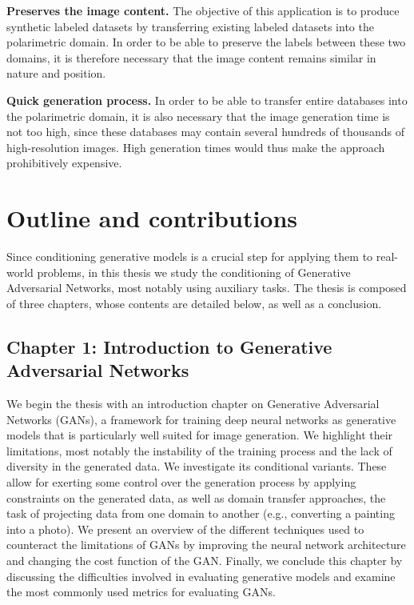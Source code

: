 \textbf{Preserves the image content.} The objective of this application is to produce synthetic labeled datasets by transferring existing labeled datasets into the polarimetric domain. In order to be able to preserve the labels between these two domains, it is therefore necessary that the image content remains similar in nature and position.

\textbf{Quick generation process.} In order to be able to transfer entire databases into the polarimetric domain, it is also necessary that the image generation time is not too high, since these databases may contain several hundreds of thousands of high-resolution images. High generation times would thus make the approach prohibitively expensive.

\section*{Outline and contributions}

Since conditioning generative models is a crucial step for applying them to real-world problems, in this thesis we study the conditioning of Generative Adversarial Networks, most notably using auxiliary tasks. The thesis is composed of three chapters, whose contents are detailed below, as well as a conclusion.

\subsection*{Chapter 1: Introduction to Generative Adversarial Networks}

We begin the thesis with an introduction chapter on Generative Adversarial Networks (GANs), a framework for training deep neural networks as generative models that is particularly well suited for image generation. We  highlight their limitations, most notably the instability of the training process and the lack of diversity in the generated data. We investigate its conditional variants. These allow for exerting some control over the generation process by applying constraints on the generated data, as well as domain transfer approaches, the task of projecting data from one domain to another (e.g., converting a painting into a photo).  We present an overview of the different techniques used to counteract the limitations of GANs by improving the neural network architecture and changing the cost function of the GAN. Finally, we conclude this chapter by discussing the difficulties involved in evaluating generative models and examine the most commonly used metrics for evaluating GANs.

